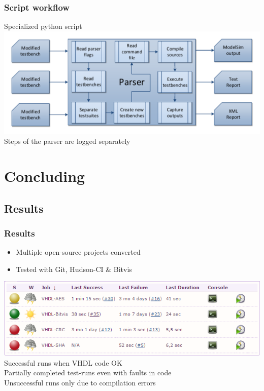 \documentclass[british,10pt]{beamer}
\begin{document}
\begin{frame}\frametitle{Script workflow}
Specialized python script
\includegraphics[width=\textwidth]{images/parserwork.pdf}
\newline{}
Steps of the parser are logged separately
\end{frame}




\section{Concluding}

\subsection{Results}
\begin{frame}\frametitle{Results}
\begin{itemize}
\item Multiple open-source projects converted
\item Tested with Git, Hudson-CI \& Bitvis
\end{itemize}
\medskip
{\centering
\includegraphics[width=\textwidth]{images/jobs.png}}
\\\hskip10pt Successful runs when VHDL code OK
\\\hskip10pt Partially completed test-runs even with faults in code
\\\hskip10pt Unsuccessful runs only due to compilation errors\\
\end{frame}
\end{document}
